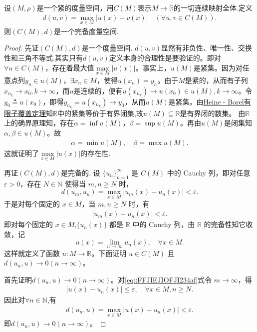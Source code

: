 \documentclass[../../main.tex]{subfiles}%
\begin{document}
\begin{theorem}\label{theorem:CMd是一个完备度量空间}
设$(M,\rho)$是一个紧的度量空间，用$C(M)$表示$M\to\mathbb{R}$的一切连续映射全体.定义
\begin{align*}
d(u,v)=\max\limits_{x\in M}|u(x)-v(x)|\quad (\forall u,v\in C(M)).
\end{align*}
则$(C(M),d)$是一个完备度量空间.
\end{theorem}
\begin{proof}

先证$(C(M),d)$是一个度量空间.
$d(u,v)$显然有非负性、唯一性、交换性和三角不等式.其实只有$d(u,v)$定义本身的合理性是要验证的。即对$\forall u\in C(M)$，存在着最大值$\max\limits_{x\in M}|u(x)|$。事实上，$u(M)$是紧集。因为对任意点列$y_n\in u(M)$，$\exists x_n\in M$，使得$u(x_n)=y_n$。由于$M$是紧的，从而有子列$x_{n_k}\to x_0,k\to\infty$，而$u$是连续的，便有$u(x_{n_k})\to u(x_0)\in u(M),k\to\infty$。令$y_0\triangleq u(x_0)$，即得$y_{n_k}=u(x_{n_k})\to y_0$，从而$u(M)$是紧集。由\hyperref[Real-Analysis-theorem:Heine - Borel有限子覆盖定理]{Heine - Borel有限子覆盖定理}知$\mathbb{R}$中的紧集等价于有界闭集,故$u(M)\subseteq \mathbb{R}$是有界闭的数集。
由$\mathbb{R}$上的确界原理知，存在$\alpha=\inf u(M)$，$\beta=\sup u(M)$。再由$u(M)$是闭集知$\alpha,\beta\in u(M)$。故
\begin{align*}
\alpha=\min u(M),\quad \beta=\max u(M).
\end{align*}
这就证明了$\max\limits_{x\in M}|u(x)|$的存在性.

再证$(C(M),d)$是完备的.
设 $\{u_n\}_{n=1}^\infty$ 是 $C(M)$ 中的 Cauchy 列，即对任意 $\varepsilon>0$，存在 $N\in\mathbb{N}$ 使得当 $m,n\geqslant N$ 时，
\[
d(u_m,u_n)=\max_{x\in M}|u_m(x)-u_n(x)|<\varepsilon.
\]
于是对每个固定的 $x\in M$，当 $m,n\geqslant N$ 时，有
\begin{align}\label{eq::FFJIEJIOFJI234af}
|u_m(x)-u_n(x)|<\varepsilon.
\end{align}
即对每个固定的 $x\in M$,$\{u_n(x)\}$ 都是 $\mathbb{R}$ 中的 Cauchy 列，由 $\mathbb{R}$ 的完备性知它收敛，记
\[
u(x)=\lim_{n\to\infty}u_n(x),\quad \forall x\in M.
\]
这样就定义了函数 $u:M\to\mathbb{R}$。下面证明 $u\in C(M)$ 且 $d(u_n,u)\to0(n\to \infty)$。

首先证明$d(u_n,u)\to0(n\to \infty)$。对\eqref{eq::FFJIEJIOFJI234af}式令 $m\to\infty$，得
\begin{align}\label{eq::hiufh3FIOUEJO}
|u(x)-u_n(x)|\leqslant \varepsilon,\quad \forall x\in M,n\geqslant N.
\end{align}
因此对$\forall n\in \mathbb{N}$,有
\begin{align*}
d(u_n,u)=\max_{x\in M}|u(x)-u_n(x)|<\varepsilon.
\end{align*}
即$d(u_n,u)\to0(n\to \infty)$。


\end{proof}
\end{document}
